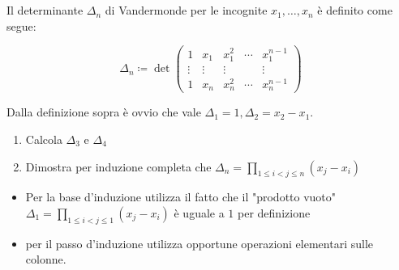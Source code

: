\documentclass[a4paper,10pt]{article}
\begin{document}


\bigskip


 \\\\
    Il determinante $\Delta_{n}$ di Vandermonde per le incognite $x_{1}, \dots, x_{n}$ è definito come segue:

        $$
        \Delta_{n} \coloneqq \det{
        \begin{pmatrix}
            1 & x_{1} & x_{1}^{2} & \cdots & x_{1}^{n-1} \\
            \vdots & \vdots & \vdots & & \vdots \\
            1 & x_{n} & x_{n}^{2} & \cdots & x_{n}^{n-1}
        \end{pmatrix}
        }
        $$

    Dalla definizione sopra è ovvio che vale $\Delta_{1}=1, \Delta_{2}=x_{2}-x_{1}$.
    \begin{enumerate}
        \item Calcola $\Delta_{3}$ e $\Delta_{4}$
        \item Dimostra per induzione completa che $\Delta_{n}=\displaystyle\prod_{ 1 \leq i < j \leq n }(x_{j} - x_{i})$
    \end{enumerate}




    \setlength{\parindent}{5ex}

    \begin{itemize}[leftmargin=10ex]        
        \item
            Per la base d'induzione utilizza il fatto che il "prodotto vuoto" 
            $\Delta_{1}=\displaystyle\prod_{ 1 \leq i < j \leq 1 }(x_{j} - x_{i})$
            è uguale a $1$ per definizione
        \item per il passo d'induzione utilizza opportune operazioni elementari sulle colonne.
    \end{itemize}

    \setlength{\parindent}{0ex}



\bigskip
\end{document}
